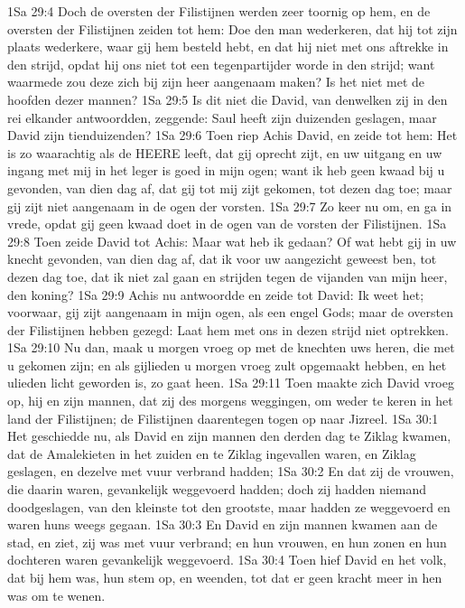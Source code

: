 1Sa 29:4  Doch de oversten der Filistijnen werden zeer toornig op hem, en de oversten der Filistijnen zeiden tot hem: Doe den man wederkeren, dat hij tot zijn plaats wederkere, waar gij hem besteld hebt, en dat hij niet met ons aftrekke in den strijd, opdat hij ons niet tot een tegenpartijder worde in den strijd; want waarmede zou deze zich bij zijn heer aangenaam maken? Is het niet met de hoofden dezer mannen?
1Sa 29:5  Is dit niet die David, van denwelken zij in den rei elkander antwoordden, zeggende: Saul heeft zijn duizenden geslagen, maar David zijn tienduizenden?
1Sa 29:6  Toen riep Achis David, en zeide tot hem: Het is zo waarachtig als de HEERE leeft, dat gij oprecht zijt, en uw uitgang en uw ingang met mij in het leger is goed in mijn ogen; want ik heb geen kwaad bij u gevonden, van dien dag af, dat gij tot mij zijt gekomen, tot dezen dag toe; maar gij zijt niet aangenaam in de ogen der vorsten.
1Sa 29:7  Zo keer nu om, en ga in vrede, opdat gij geen kwaad doet in de ogen van de vorsten der Filistijnen.
1Sa 29:8  Toen zeide David tot Achis: Maar wat heb ik gedaan? Of wat hebt gij in uw knecht gevonden, van dien dag af, dat ik voor uw aangezicht geweest ben, tot dezen dag toe, dat ik niet zal gaan en strijden tegen de vijanden van mijn heer, den koning?
1Sa 29:9  Achis nu antwoordde en zeide tot David: Ik weet het; voorwaar, gij zijt aangenaam in mijn ogen, als een engel Gods; maar de oversten der Filistijnen hebben gezegd: Laat hem met ons in dezen strijd niet optrekken.
1Sa 29:10  Nu dan, maak u morgen vroeg op met de knechten uws heren, die met u gekomen zijn; en als gijlieden u morgen vroeg zult opgemaakt hebben, en het ulieden licht geworden is, zo gaat heen.
1Sa 29:11  Toen maakte zich David vroeg op, hij en zijn mannen, dat zij des morgens weggingen, om weder te keren in het land der Filistijnen; de Filistijnen daarentegen togen op naar Jizreel.
1Sa 30:1  Het geschiedde nu, als David en zijn mannen den derden dag te Ziklag kwamen, dat de Amalekieten in het zuiden en te Ziklag ingevallen waren, en Ziklag geslagen, en dezelve met vuur verbrand hadden;
1Sa 30:2  En dat zij de vrouwen, die daarin waren, gevankelijk weggevoerd hadden; doch zij hadden niemand doodgeslagen, van den kleinste tot den grootste, maar hadden ze weggevoerd en waren huns weegs gegaan.
1Sa 30:3  En David en zijn mannen kwamen aan de stad, en ziet, zij was met vuur verbrand; en hun vrouwen, en hun zonen en hun dochteren waren gevankelijk weggevoerd.
1Sa 30:4  Toen hief David en het volk, dat bij hem was, hun stem op, en weenden, tot dat er geen kracht meer in hen was om te wenen.
